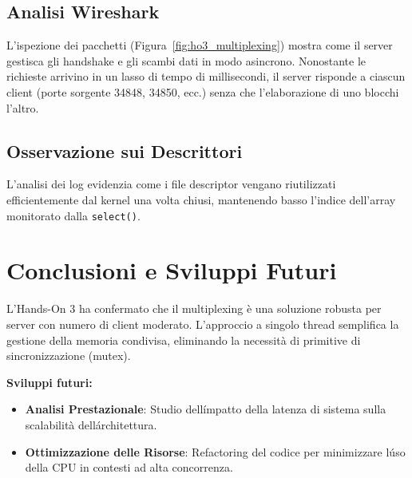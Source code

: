 \documentclass[a4paper,12pt]{article}
\begin{document}
\subsection{Analisi Wireshark}
L'ispezione dei pacchetti (Figura~\ref{fig:ho3_multiplexing}) mostra come il server gestisca gli handshake e gli scambi dati in modo asincrono. Nonostante le richieste arrivino in un lasso di tempo di millisecondi, il server risponde a ciascun client (porte sorgente 34848, 34850, ecc.) senza che l'elaborazione di uno blocchi l'altro.

\subsection{Osservazione sui Descrittori}
L'analisi dei log evidenzia come i file descriptor vengano riutilizzati efficientemente dal kernel una volta chiusi, mantenendo basso l'indice dell'array monitorato dalla \texttt{select()}.

\section{Conclusioni e Sviluppi Futuri}
L'Hands-On 3 ha confermato che il multiplexing è una soluzione robusta per server con numero di client moderato. L'approccio a singolo thread semplifica la gestione della memoria condivisa, eliminando la necessità di primitive di sincronizzazione (mutex).

\noindent \textbf{Sviluppi futuri:}
\begin{itemize}
    \item \textbf{Analisi Prestazionale}: Studio dell\'impatto della latenza di sistema sulla scalabilità dell\'architettura.
    \item \textbf{Ottimizzazione delle Risorse}: Refactoring del codice per minimizzare l\'uso della CPU in contesti ad alta concorrenza.
\end{itemize}
\end{document}
